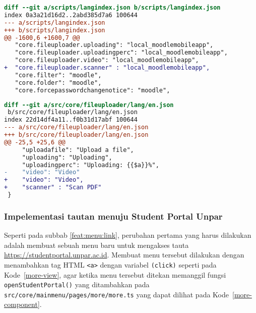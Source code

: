 \begin{lstlisting}[language=diff, frame=single, label ={langindex.json}, caption = Perubahan pada file \texttt{langindex.json} ]
diff --git a/scripts/langindex.json b/scripts/langindex.json
index 0a3a21d16d2..2abd385d7a6 100644
--- a/scripts/langindex.json
+++ b/scripts/langindex.json
@@ -1600,6 +1600,7 @@
   "core.fileuploader.uploading": "local_moodlemobileapp",
   "core.fileuploader.uploadingperc": "local_moodlemobileapp",
   "core.fileuploader.video": "local_moodlemobileapp",
+  "core.fileuploader.scanner" : "local_moodlemobileapp",
   "core.filter": "moodle",
   "core.folder": "moodle",
   "core.forcepasswordchangenotice": "moodle",
\end{lstlisting} 

\begin{lstlisting}[language=diff, frame=single, label ={fileuploader-lang-eng}, caption = Perubahan pada file \texttt{src/core/fileuploader/lang/en.json} ]
diff --git a/src/core/fileuploader/lang/en.json
 b/src/core/fileuploader/lang/en.json
index 22d14df4a11..f0b31d17abf 100644
--- a/src/core/fileuploader/lang/en.json
+++ b/src/core/fileuploader/lang/en.json
@@ -25,5 +25,6 @@
     "uploadafile": "Upload a file",
     "uploading": "Uploading",
     "uploadingperc": "Uploading: {{$a}}%",
-    "video": "Video"
+    "video": "Video",
+    "scanner" : "Scan PDF"
 }
\end{lstlisting} 

\subsubsection{Impelementasi tautan menuju Student Portal Unpar}
Seperti pada subbab \ref{feat:menu:link}, perubahan pertama yang harus dilakukan adalah membuat sebuah menu baru untuk mengakses tauta \url{https://studentportal.unpar.ac.id}. Membuat menu tersebut dilakukan dengan menambahkan tag HTML \texttt{<a>} dengan variabel \texttt{(click)} seperti pada \mbox{Kode \ref{more-view}}, agar ketika menu tersebut ditekan memanggil fungsi \texttt{openStudentPortal()} yang ditambahkan pada \texttt{src/core/mainmenu/pages/more/more.ts} yang dapat dilihat pada \mbox{Kode \ref{more-component}}.

